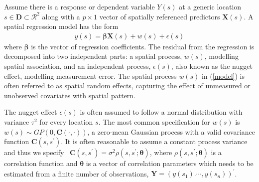 \documentclass[
12pt, %
a4paper, %
oneside, %
headinclude,footinclude, %
BCOR5mm, %
]{scrartcl}
\begin{document}
Assume there is a response or dependent variable $Y(s)$ at a generic location $s \in \boldsymbol{D} \subset \mathcal{R}^2$ along with a $p \times 1$ vector of spatially referenced predictors $\boldsymbol{X}(s)$. A spatial regression model has the form
\begin{equation}
\begin{aligned}
y(s) = \boldsymbol{\beta}\boldsymbol{X}(s) + w(s) + \epsilon(s)
\end{aligned} \label{model}
\end{equation}
where $\boldsymbol{\beta}$ is the vector of regression coefficients. The residual from the regression is decomposed into two independent parts: a spatial process, $w(s)$, modelling spatial association, and an independent process, $\epsilon(s)$, also known as the nugget effect, modelling measurement error. The spatial process $w(s)$ in (\ref{model}) is often referred to as spatial random effects, capturing the effect of unmeasured or unobserved covariates with spatial pattern.

The nugget effect $\epsilon(s)$ is often assumed to follow a normal distribution with variance $\tau^2$ for every location $s$.
The most common specification for $w(s)$ is $w(s) \sim GP(0, \boldsymbol{C}(\cdot, \cdot))$, a zero-mean Gaussian process with a valid covariance function $\boldsymbol{C}(s, s^\prime)$. It is often reasonable to assume a constant process variance and thus we specify \
$\boldsymbol{C}(s, s^\prime) = \sigma^2 \rho (s, s^\prime; \boldsymbol{\theta})$, where $\rho (s, s^\prime; \boldsymbol{\theta})$ is a correlation function and $\boldsymbol{\theta}$ is a vector of correlation parameters which needs to be estimated from a finite number of observations, $\boldsymbol{Y} = \left(y(s_1). \cdots, y(s_n)\right)^\prime$.
\end{document}
